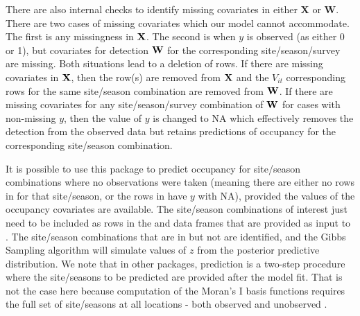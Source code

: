 There are also internal checks to identify missing covariates in either $\textbf{X}$ or $\textbf{W}$.  There are two cases of missing covariates which our model cannot accommodate.  The first is any missingness in ${\bf X}$.  The second is when $y$ is observed (as either 0 or 1), but covariates for detection ${\bf W}$ for the corresponding site/season/survey are missing.  Both situations lead to a deletion of rows.  If there are missing covariates in ${\bf X}$, then the row(s) are removed from ${\bf X}$ and the $V_{it}$ corresponding rows for the same site/season combination are removed from ${\bf W}$. If there are missing covariates for any site/season/survey combination of ${\bf W}$ for cases with non-missing $y$, then the value of $y$ is  changed to NA which effectively removes the detection from the observed data but retains predictions of occupancy for the corresponding site/season combination.

It is possible to use this package to predict occupancy for site/season combinations where no observations were taken (meaning there are either no rows in  for that site/season, or the rows in  have $y$ with NA), provided the values of the occupancy covariates are available. The site/season combinations of interest just need to be included as rows in the  and  data frames that are provided as input to . The site/season combinations that are in  but not  are identified, and the Gibbs Sampling algorithm will simulate values of $z$ from the posterior predictive distribution. We note that in other packages, prediction is a two-step procedure where the site/seasons to be predicted are provided after the model fit. That is not the case here because computation of the Moran's I basis functions requires the full set of site/seasons at all locations - both observed and unobserved \citep{bradley2015multivariate}.

